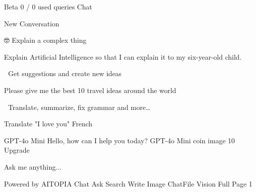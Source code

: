




Beta
0 / 0
used queries
Chat

New Conversation

🤓 Explain a complex thing

Explain Artificial Intelligence so that I can explain it to my six-year-old child.


🧠 Get suggestions and create new ideas

Please give me the best 10 travel ideas around the world


💭 Translate, summarize, fix grammar and more…

Translate "I love you" French


GPT-4o Mini
Hello, how can I help you today?
GPT-4o Mini
coin image
10
Upgrade




Ask me anything...



Powered by AITOPIA 
Chat
Ask
Search
Write
Image
ChatFile
Vision
Full Page
1